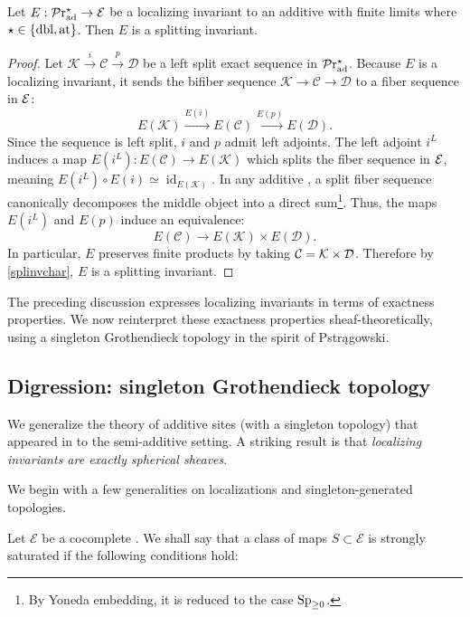 \documentclass[a4paper,10pt, oneside]{amsart}
\begin{document}
	\begin{prop}
		Let $E: \mathcal{P}\mathrm{r}_{\mathrm{ad}}^\star\to\mathcal{E}$ be a localizing invariant to an additive \infcat with finite limits  where $\star \in \{ \mathrm{dbl}, \mathrm{at} \}$. Then $E$ is a splitting invariant. 
	\end{prop}
	\begin{proof}
	Let $\mathcal{K} \xrightarrow{i} \mathcal{C} \xrightarrow{p} \mathcal{D}$ be a left split exact sequence in $\mathcal{P}\mathrm{r}_{\mathrm{ad}}^\star$. Because $E$ is a localizing invariant, it sends the bifiber sequence $\mathcal{K} \to \mathcal{C} \to \mathcal{D}$ to a fiber sequence in $\mathcal{E}$:
	$$ E(\mathcal{K}) \xrightarrow{E(i)} E(\mathcal{C}) \xrightarrow{E(p)} E(\mathcal{D}). $$
	Since the sequence is left split, $i$ and $p$ admit left adjoints.
	The left adjoint $i^L$ induces a map $E(i^L): E(\mathcal{C}) \to E(\mathcal{K})$ which splits the fiber sequence in $\mathcal{E}$, meaning $E(i^L) \circ E(i) \simeq \operatorname{id}_{E(\mathcal{K})}$. In any additive \infcat, a split fiber sequence canonically decomposes the middle object into a direct sum\footnote{By Yoneda embedding, it is reduced to the case $\operatorname{Sp}_{\geq0}$.}. Thus, the maps $E(i^L)$ and $E(p)$ induce an equivalence:
	$$ E(\mathcal{C}) \xrightarrow{} E(\mathcal{K})\times E(\mathcal{D}). $$
	In particular, $E$ preserves finite products by taking $ \mathcal{C}=\mathcal{K}\times \mathcal{D}$.
	Therefore by \cref{splinvchar}, $E$ is a splitting invariant.
	\end{proof}
	The preceding discussion expresses localizing invariants in terms of exactness properties. We now reinterpret these exactness properties sheaf-theoretically, using a singleton Grothendieck topology in the spirit of Pstrągowski.
		\subsection{Digression: singleton Grothendieck topology}
	We generalize the theory of additive sites (with a singleton topology) that appeared in \cite[]{pstrkagowski2023synthetic} to the semi-additive setting. A striking result is that  \emph{localizing invariants are  exactly spherical sheaves}.
	
	
	We begin with a few generalities on localizations and singleton-generated topologies.
	\begin{de}
		Let $\mathcal{E}$ be a cocomplete \infcat. We shall say that a class of maps $S \subset \mathcal{E}$ is strongly saturated if the following conditions hold:
	\end{de}
\end{document}
